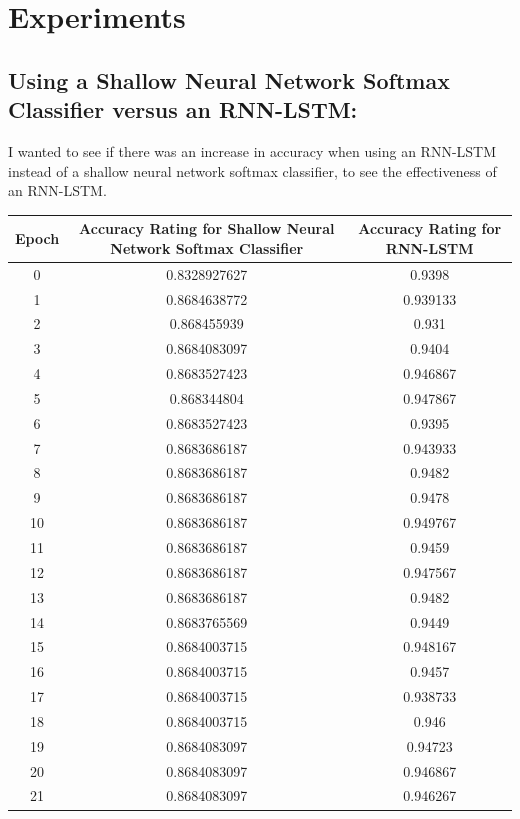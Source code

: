 \documentclass[a4paper]{article}
\begin{document}
\section{Experiments}
\subsection{Using a Shallow Neural Network Softmax Classifier versus an RNN-LSTM:}
\hspace*{10mm}
I wanted to see if there was an increase in accuracy when using an RNN-LSTM instead of a shallow neural network softmax classifier, to see the effectiveness of an RNN-LSTM.
\begin{center}
 \begin{tabular}{||c c c||} 
 \hline
Epoch &
Accuracy Rating for Shallow Neural Network Softmax Classifier &
Accuracy Rating for RNN-LSTM \\[0.5ex] \hline\hline
0 &
0.8328927627 &
0.9398 \\ 
 \hline
1 &
0.8684638772&
0.939133 \\ 
 \hline
2&
0.868455939&
0.931 \\ 
 \hline
3&
0.8684083097&
0.9404\\ 
 \hline
4&
0.8683527423&
0.946867\\ 
 \hline
5&
0.868344804&
0.947867\\ 
 \hline
6&
0.8683527423&
0.9395\\ 
 \hline
7&
0.8683686187&
0.943933\\ 
 \hline
8&
0.8683686187&
0.9482\\ 
 \hline
9&
0.8683686187&
0.9478\\ 
 \hline
10&
0.8683686187&
0.949767\\ 
 \hline
11&
0.8683686187&
0.9459\\ 
 \hline
12&
0.8683686187&
0.947567\\ 
 \hline
13&
0.8683686187&
0.9482\\ 
 \hline
14&
0.8683765569&
0.9449\\ 
 \hline
15&
0.8684003715&
0.948167\\ 
 \hline
16&
0.8684003715&
0.9457\\ 
 \hline
17&
0.8684003715&
0.938733\\ 
 \hline
18&
0.8684003715&
0.946\\ 
 \hline
19&
0.8684083097&
0.94723\\ 
 \hline
20&
0.8684083097&
0.946867\\ 
 \hline
21&
0.8684083097&
0.946267\\ 

\end{tabular}
\end{center}
\end{document}
